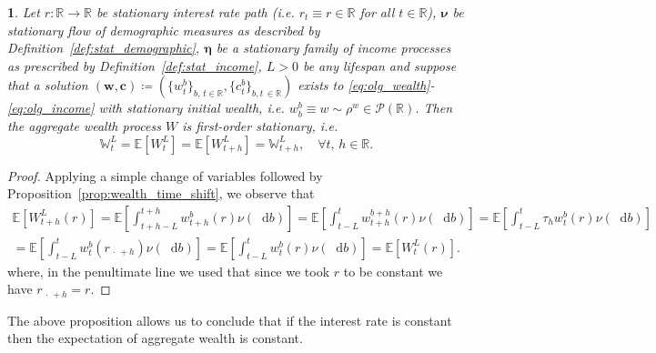 \documentclass[11pt,oneside,english,reqno,dvipsnames,table]{amsart}
\numberwithin{equation}{section}
\theoremstyle{plain}
\theoremstyle{definition}
\theoremstyle{remark}
\theoremstyle{plain}
\theoremstyle{plain}
\newtheorem{prop}[thm]{\protect\propositionname}
\theoremstyle{plain}
\theoremstyle{plain}
\theoremstyle{plain}
\theoremstyle{plain}
\theoremstyle{plain}
\providecommand{\propositionname}{Proposition}
\newcommand{\EE}{\mathbb{E}}
\newcommand{\RR}{\mathbb{R}}
\newcommand{\bc}{\mathbf{c}}
\newcommand{\bw}{\mathbf{w}}
\newcommand{\dd}{\mathop{}\!\mathrm{d}}
\newcommand{\mcP}{\mathcal{P}}
\newcommand{\mbE}{\mathbb{E}}
\newcommand{\mbR}{\mathbb{R}}
\newcommand{\mbW}{\mathbb{W}}
\newcommand{\bmeta}{\boldsymbol{\eta}}
\newcommand{\bnu}{\boldsymbol{\nu}}
\numberwithin{thm}{section}
\begin{document}
\begin{prop}\label{prop:firstorderstationary}
     Let $r:\mbR\to \mbR$ be stationary interest rate path (i.e. $r_t\equiv r\in \mbR$ for all $t\in \mbR$), $\bnu$ be stationary flow of demographic measures as described by Definition~\ref{def:stat_demographic}, $\bmeta$ be a stationary family of income processes as prescribed by Definition~\ref{def:stat_income}, $L>0$ be any lifespan and suppose that a solution $(\bw,\bc) \coloneqq (\{w^b_t\}_{b,\,t\in \mbR},\{c^b_t\}_{b,t\, \in \mbR})$ exists to \eqref{eq:olg_wealth}-\eqref{eq:olg_income} with stationary initial wealth, i.e. $w^b_b \equiv w \sim \rho^w \in \mcP(\mbR)$. Then the aggregate wealth process $W$ is first-order stationary, i.e.
   \begin{equation*}
      \mbW^L_t =  \EE[W^L_t]=\EE[W^L_{t+h}] = \mbW^L_{t+h}, \quad \forall t,\, h\in \RR. 
   \end{equation*}
\end{prop}
%
%
\begin{proof}
Applying a simple change of variables followed by  Proposition~\ref{prop:wealth_time_shift}, we observe that 
%
\begin{align*}
     \mbE\left[W^L_{t+h}(r)\right] = \mbE\left[\int_{t+h-L}^{t+h} w_{t+h}^{b}(r) \nu(\dd b)\right]  
     = \mbE\left[\int_{t-L}^{t} w_{t+h}^{b+h}(r) \nu(\dd b)\right]  =  \mbE\left[\int_{t-L}^{t} \tau_h w_{t}^{b}(r) \nu(\dd b)\right] 
     \\
     = \mbE\left[\int_{t-L}^{t}  w_{t}^{b}(r_{\,\cdot\,+h}) \nu(\dd b)\right] 
       = \mbE\left[\int_{t-L}^{t}  w_{t}^{b}(r) \nu(\dd b)\right]
     = \mbE\left[W^L_t(r)\right].
\end{align*}
%
where, in the penultimate line we used that since we took $r$ to be constant we have $r_{\,\cdot\,+h}=r$.
%
%
\end{proof}


The above proposition allows us to conclude that if the interest rate is constant then the expectation of aggregate wealth is constant. 
\end{document}
